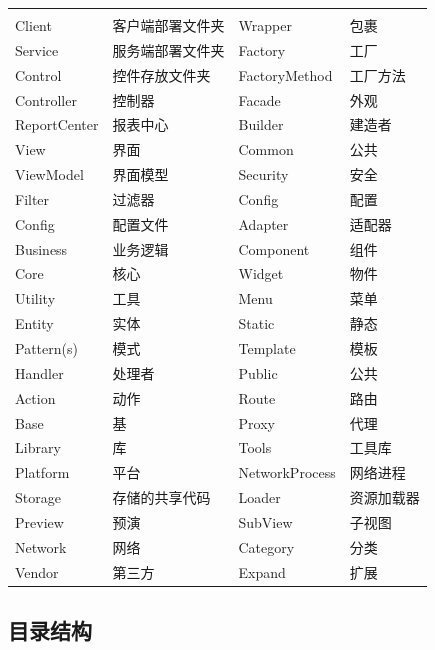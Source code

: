 \documentclass{book}
\begin{document}
\begin{tabular}{ll|ll}
	\multirow{1}{*}{}			
	& \multicolumn{1}{c}{}
	& \multicolumn{1}{c}{}
	& \multicolumn{1}{c}{}\\
	Client & 客户端部署文件夹 & Wrapper & 包裹\\
	Service & 服务端部署文件夹 & Factory & 工厂\\	
	Control & 控件存放文件夹 & FactoryMethod & 工厂方法\\
	Controller & 控制器 & Facade & 外观\\
	ReportCenter & 报表中心 & Builder & 建造者\\
	View & 界面 & Common & 公共\\
	ViewModel & 界面模型 & Security & 安全\\
	Filter & 过滤器 & Config & 配置\\
	Config & 配置文件 & Adapter & 适配器\\
	Business & 业务逻辑 & Component & 组件 \\
	Core & 核心 & Widget & 物件\\
	Utility & 工具 & Menu & 菜单\\
	Entity & 实体 & Static & 静态\\
	Pattern(s) & 模式 & Template & 模板\\
	Handler & 处理者 & Public\footnotemark[1] & 公共\\
	Action & 动作 & Route & 路由\\
	Base & 基 & Proxy & 代理\\ 
	Library & 库 & Tools & 工具库 \\
    Platform & 平台 & NetworkProcess & 网络进程 \\
    Storage & 存储的共享代码 & Loader & 资源加载器\\
    Preview\footnotemark[2] & 预演 & SubView & 子视图\\
    Network & 网络 & Category & 分类\\
    Vendor\footnotemark[3] & 第三方 & Expand & 扩展\\
\end{tabular}


\subsection{目录结构}
\end{document}
